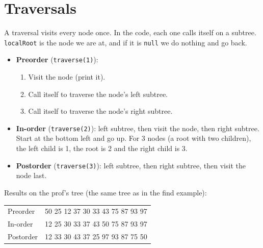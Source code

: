 \documentclass[11pt]{article}
\begin{document}
	\section{Traversals}
	A traversal visits every node once. In the code, each one calls itself on a subtree. \texttt{localRoot} is the node we are at, and if it is \texttt{null} we do nothing and go back.
	
	\begin{itemize}
		\item \textbf{Preorder} (\texttt{traverse(1)}):
		\begin{enumerate}
			\item Visit the node (print it).
			\item Call itself to traverse the node's left subtree.
			\item Call itself to traverse the node's right subtree.
		\end{enumerate}
		\item \textbf{In-order} (\texttt{traverse(2)}): left subtree, then visit the node, then right subtree. Start at the bottom left and go up. For 3 nodes (a root with two children), the left child is 1, the root is 2 and the right child is 3.
		\item \textbf{Postorder} (\texttt{traverse(3)}): left subtree, then right subtree, then visit the node last.
	\end{itemize}
	
	Results on the prof's tree (the same tree as in the find example):
	\begin{center}
		\begin{tabular}{ll}
			Preorder  & 50 25 12 37 30 33 43 75 87 93 97 \\
			In-order  & 12 25 30 33 37 43 50 75 87 93 97 \\
			Postorder & 12 33 30 43 37 25 97 93 87 75 50
		\end{tabular}
	\end{center}
	
\end{document}
